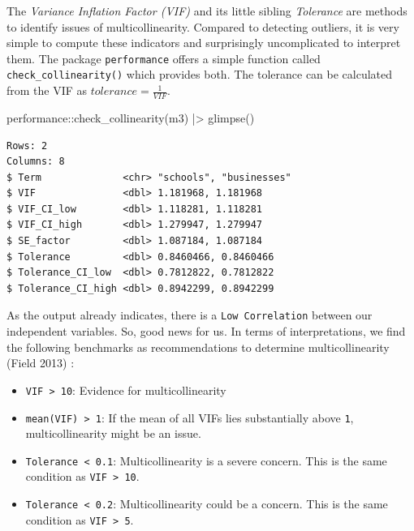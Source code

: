 \documentclass[
  letterpaper,
  DIV=11,
  numbers=noendperiod]{scrreprt}
\newenvironment{Shaded}{\begin{snugshade}}{\end{snugshade}}
\newcommand{\FunctionTok}[1]{\textcolor[rgb]{0.28,0.35,0.67}{#1}}
\newcommand{\NormalTok}[1]{\textcolor[rgb]{0.00,0.23,0.31}{#1}}
\newcommand{\SpecialCharTok}[1]{\textcolor[rgb]{0.37,0.37,0.37}{#1}}
\begin{document}
The \emph{Variance Inflation Factor (VIF)} and its little sibling
\emph{Tolerance} are methods to identify issues of multicollinearity.
Compared to detecting outliers, it is very simple to compute these
indicators and surprisingly uncomplicated to interpret them. The package
\texttt{performance} offers a simple function called
\texttt{check\_collinearity()} which provides both. The tolerance can be
calculated from the VIF as \(tolerance = \frac{1}{VIF}\).

\begin{Shaded}
\begin{Highlighting}[]
\NormalTok{performance}\SpecialCharTok{::}\FunctionTok{check\_collinearity}\NormalTok{(m3) }\SpecialCharTok{|\textgreater{}}
  \FunctionTok{glimpse}\NormalTok{()}
\end{Highlighting}
\end{Shaded}

\begin{verbatim}
Rows: 2
Columns: 8
$ Term              <chr> "schools", "businesses"
$ VIF               <dbl> 1.181968, 1.181968
$ VIF_CI_low        <dbl> 1.118281, 1.118281
$ VIF_CI_high       <dbl> 1.279947, 1.279947
$ SE_factor         <dbl> 1.087184, 1.087184
$ Tolerance         <dbl> 0.8460466, 0.8460466
$ Tolerance_CI_low  <dbl> 0.7812822, 0.7812822
$ Tolerance_CI_high <dbl> 0.8942299, 0.8942299
\end{verbatim}

As the output already indicates, there is a \texttt{Low\ Correlation}
between our independent variables. So, good news for us. In terms of
interpretations, we find the following benchmarks as recommendations to
determine multicollinearity (Field 2013) :

\begin{itemize}
\item
  \texttt{VIF\ \textgreater{}\ 10}: Evidence for multicollinearity
\item
  \texttt{mean(VIF)\ \textgreater{}\ 1}: If the mean of all VIFs lies
  substantially above \texttt{1}, multicollinearity might be an issue.
\item
  \texttt{Tolerance\ \textless{}\ 0.1}: Multicollinearity is a severe
  concern. This is the same condition as
  \texttt{VIF\ \textgreater{}\ 10}.
\item
  \texttt{Tolerance\ \textless{}\ 0.2}: Multicollinearity could be a
  concern. This is the same condition as
  \texttt{VIF\ \textgreater{}\ 5}.
\end{itemize}
\end{document}
